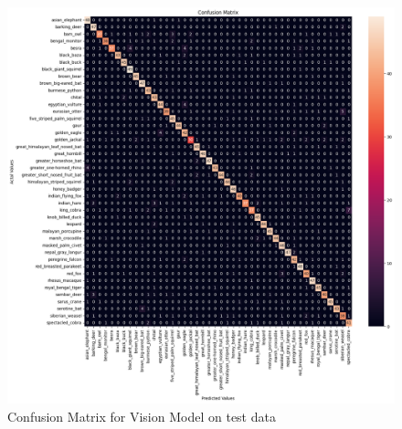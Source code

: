 \documentclass[fleqn, 10pt, twoside]{IOEGC}
\begin{document}
\begin{figure}[t] %
	\centering
	\begin{minipage}{\textwidth} %
		\includegraphics[scale=0.53]{Graphics/vision_cm.png} %
		\caption{Confusion Matrix for Vision Model on test data}
		\label{cm_vision}
	\end{minipage}
\end{figure}
\end{document}
